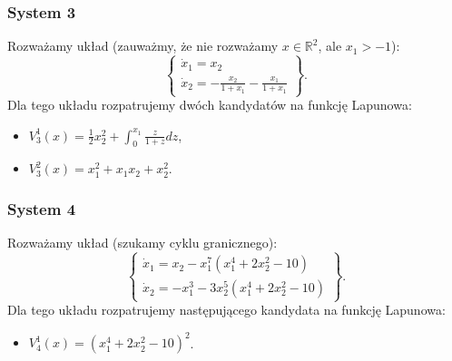 \documentclass{sprawozdanie-agh}
\begin{document}
        \subsubsection{System 3}
        Rozważamy układ (zauważmy, że nie rozważamy $x\in \mathbb{R}^{2}$, ale $x_{1} > -1$):
        \begin{equation}
            \label{eq:zadania_przyklad_3}
            \left\{
            \begin{array}{l}
                 \dot{x}_{1} = x_{2}\\
                 \dot{x}_{2} = -\frac{x_{2}}{1 + x_{1}} - \frac{x_{1}}{1 + x_{1}}
            \end{array}
            \right\}.
        \end{equation}
        Dla tego układu rozpatrujemy dwóch kandydatów na funkcję Lapunowa:
        \begin{itemize}[(a)]
            \item $V_{3}^{1}(x) = \frac{1}{2}x_{2}^{2} + \int_{0}^{x_{1}}{\frac{z}{1+z}dz}$,
            \item $V_{3}^{2}(x) = x_{1}^{2} + x_{1}x_{2} + x_{2}^{2}$.
        \end{itemize}

        \subsubsection{System 4}
        Rozważamy układ (szukamy cyklu granicznego):
        \begin{equation}
            \label{eq:zadania_przyklad_4}
            \left\{
            \begin{array}{l}
                 \dot{x}_{1} = x_{2} - x_{1}^7 \left( x_{1}^{4} + 2x_{2}^{2} - 10 \right)\\
                 \dot{x}_{2} = -x_{1}^{3} - 3x_{2}^{5} \left( x_{1}^{4} + 2x_{2}^{2} - 10 \right)
            \end{array}
            \right\}.
        \end{equation}
        Dla tego układu rozpatrujemy następującego kandydata na funkcję Lapunowa:
        \begin{itemize}[(a)]
            \item $V_{4}^{1}(x) = \left( x_{1}^{4} + 2x_{2}^{2} - 10 \right)^{2}$.
        \end{itemize}
\end{document}
